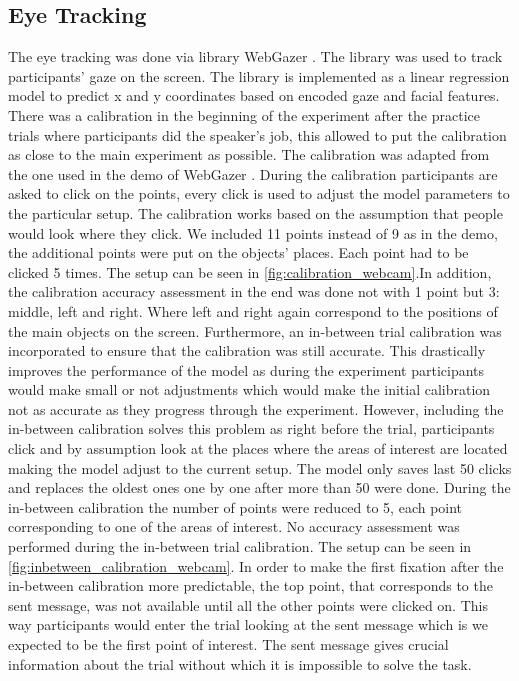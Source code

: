 \subsection{Eye Tracking}
\label{sec:data:eyetr}
The eye tracking was done via library WebGazer \citep{webgazer}. The library was used to track participants' gaze on the screen. The library is implemented as a linear regression model to predict x and y coordinates based on encoded gaze and facial features. There was a calibration in the beginning of the experiment after the practice trials where participants did the speaker's job, this allowed to put the calibration as close to the main experiment as possible. The calibration was adapted from the one used in the demo of WebGazer \citep{webgazer}. During the calibration participants are asked to click on the points, every click is used to adjust the model parameters to the particular setup. The calibration works based on the assumption that people would look where they click. We included 11 points instead of 9 as in the demo, the additional points were put on the objects' places. Each point had to be clicked 5 times. The setup can be seen in \autoref{fig:calibration_webcam}.In addition, the calibration accuracy assessment in the end was done not with 1 point but 3: middle, left and right. Where left and right again correspond to the positions of the main objects on the screen. Furthermore, an in-between trial calibration was incorporated to ensure that the calibration was still accurate. This drastically improves the performance of the model as during the experiment participants would make small or not adjustments which would make the initial calibration not as accurate as they progress through the experiment. However, including the in-between calibration solves this problem as right before the trial, participants click and by assumption look at the places where the areas of interest are located making the model adjust to the current setup. The model only saves last 50 clicks and replaces the oldest ones one by one after more than 50 were done. During the in-between calibration the number of points were reduced to 5, each point corresponding to one of the areas of interest. No accuracy assessment was performed during the in-between trial calibration. The setup can be seen in \autoref{fig:inbetween_calibration_webcam}. In order to make the first fixation after the in-between calibration more predictable, the top point, that corresponds to the sent message, was not available until all the other points were clicked on. This way participants would enter the trial looking at the sent message which is we expected to be the first point of interest. The sent message gives crucial information about the trial without which it is impossible to solve the task.

